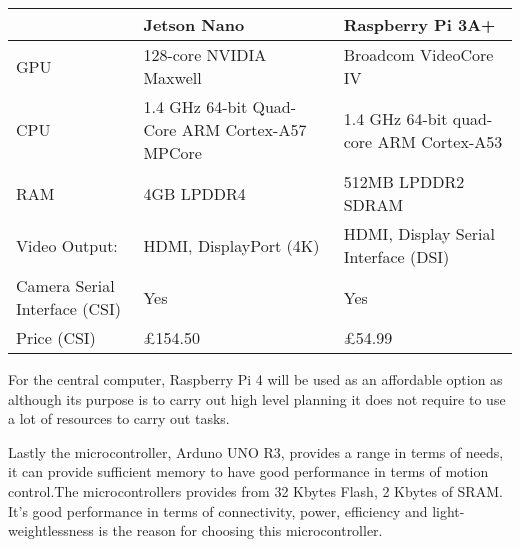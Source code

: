 \documentclass[11pt]{article}
\begin{document}
	\begin{center}
		\setlength{\tabcolsep}{10pt} %
		\renewcommand{\arraystretch}{1.5} %
		\begin{tabular}{ | m{3cm} |m{3cm} | m{4cm}|  } 
			
			\hline
			& Jetson Nano & Raspberry Pi 3A+   
			\\ 
			
			\hline
			
			GPU & 128-core NVIDIA Maxwell & Broadcom VideoCore IV  \\ 
			
			\hline
			CPU
			& 1.4 GHz 64-bit Quad-Core ARM Cortex-A57 MPCore & 1.4 GHz 64-bit quad-core ARM Cortex-A53
			
			\\ 
			\hline
			
			
			\hline
			RAM
			
			
			& 4GB LPDDR4 &
			512MB LPDDR2 SDRAM
			
			\\ 
			\hline
			
			Video Output: & HDMI, DisplayPort (4K) & HDMI, Display Serial Interface (DSI)
			\\ 
			\hline
			Camera Serial Interface (CSI) & Yes & Yes\\ 
			\hline
			
			
			
			\hline
			Price (CSI) & £154.50 & £54.99\\ 
			\hline
		\end{tabular}
	\end{center}
	
	
	
	For the central computer, Raspberry Pi 4 will be used as an affordable option as although its purpose is to carry out high level planning it does not require to use a lot of resources to carry out tasks.
	
	
	Lastly the microcontroller, Arduno UNO R3, provides a range in terms of needs, it can provide sufficient memory to have good performance in terms of motion control.The microcontrollers provides from 32 Kbytes Flash, 2  Kbytes of SRAM. It's good performance in terms of connectivity, power, efficiency and light-weightlessness is the reason for choosing this microcontroller.
	
	
	
\end{document}
